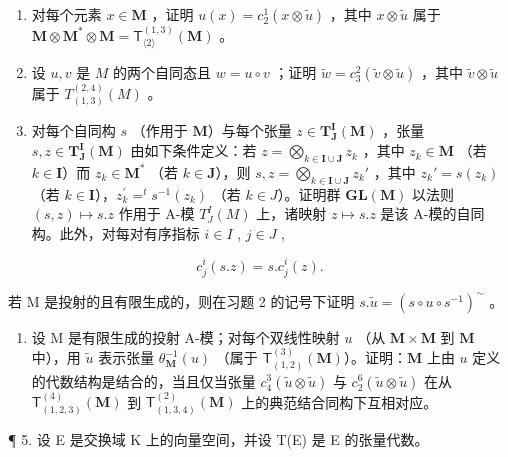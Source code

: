 \begin{enumerate}
\def\labelenumi{(\alph{enumi})}
\item
  对每个元素 \(x \in \mathbf{M}\) ，证明 \(u(x) = c_2^1(x \otimes \tilde{u})\) ，其中 \(x \otimes \tilde{u}\) 属于 \(\mathbf{M} \otimes \mathbf{M}^* \otimes \mathbf{M} = \mathsf{T}_{\langle 2\rangle}^{(1,3)}(\mathbf{M})\) 。
\item
  设 \(u, v\) 是 \(M\) 的两个自同态且 \(w = u \circ v\) ；证明 \(\tilde{w} = c_3^2(\tilde{v} \otimes \tilde{u})\) ，其中 \(\tilde{v} \otimes \tilde{u}\) 属于 \(T_{(1,3)}^{(2,4)}(M)\) 。
\item
  对每个自同构 \(s\) （作用于 \(\mathbf{M}\)）与每个张量 \(z \in \mathbf{T}_{\mathbf{J}}^{\mathbf{I}}(\mathbf{M})\) ，张量 \(s, z \in \mathbf{T}_{\mathbf{J}}^{\mathbf{I}}(\mathbf{M})\) 由如下条件定义：若 \(z = \bigotimes_{k \in \mathbf{I} \cup \mathbf{J}} z_k\) ，其中 \(z_k \in \mathbf{M}\) （若 \(k \in \mathbf{I}\)）而 \(z_k \in \mathbf{M}^*\) （若 \(k \in \mathbf{J}\)），则 \(s, z = \bigotimes_{k \in \mathbf{I} \cup \mathbf{J}} z_k'\) ，其中 \(z_k' = s(z_k)\) （若 \(k \in \mathbf{I}\)），\(z_{k}^{\prime}=^{t}s^{-1}(z_{k})\) （若 \(k\in J\)）。证明群 \(\mathbf{GL}(\mathbf{M})\) 以法则 \((s,z)\mapsto s.z\) 作用于 A-模 \(T_{J}^{I}(M)\) 上，诸映射 \(z\mapsto s.z\) 是该 A-模的自同构。此外，对每对有序指标 \(i\in I\) , \(j\in J\) ,
\end{enumerate}

\[
c _ {j} ^ {i} (s. z) = s. c _ {j} ^ {i} (z).
\]

若 M 是投射的且有限生成的，则在习题 2 的记号下证明 \(s. \tilde{u} = (s \circ u \circ s^{-1})^{\sim}\) 。

\begin{enumerate}
\def\labelenumi{\arabic{enumi}.}
\setcounter{enumi}{3}
\tightlist
\item
  设 M 是有限生成的投射 A-模；对每个双线性映射 \(u\) （从 \(\mathbf{M} \times \mathbf{M}\) 到 \(\mathbf{M}\) 中），用 \(\tilde{u}\) 表示张量 \(\theta_{\mathbf{M}}^{-1}(u)\) （属于 \(\mathsf{T}_{(1,2)}^{(3)}(\mathbf{M})\)）。证明：\(\mathbf{M}\) 上由 \(u\) 定义的代数结构是结合的，当且仅当张量 \(c_4^3 (\tilde{u} \otimes \tilde{u})\) 与 \(c_2^6 (\tilde{u} \otimes \tilde{u})\) 在从 \(\mathsf{T}_{(1,2,3)}^{(4)}(\mathbf{M})\) 到 \(\mathsf{T}_{(1,3,4)}^{(2)}(\mathbf{M})\) 上的典范结合同构下互相对应。
\end{enumerate}

¶ 5. 设 E 是交换域 K 上的向量空间，并设 T(E) 是 E 的张量代数。

